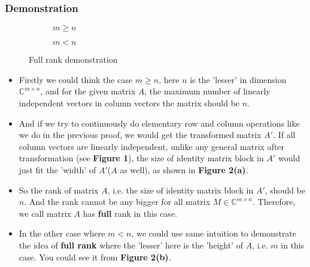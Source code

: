 \subsubsection*{Demonstration}
\begin{figure}[H]
  \centering
  \captionsetup[subfigure]{justification=centering}
  \begin{subfigure}[b]{0.5\textwidth}
    \centering
    \caption{$m \ge n$}
    \end{subfigure}
    \hfill
    \begin{subfigure}[b]{0.4\textwidth}
      \centering
      \caption{$m < n$}
    \end{subfigure}
    \caption{Full rank demonstration}
\end{figure}
\begin{itemize}
  \item Firstly we could think the case $m \ge n$, here $n$ is the 'lesser' in dimension $\mathbb{C}^{m \times n}$, and for the given matrix $A$, the maximum number of linearly independent vectors in column vectors the matrix should be $n$. 
  \item And if we try to continuously do elementary row and column operations like we do in the previous proof, we would get the transformed matrix $A'$. If all column vectors are linearly independent, unlike any general matrix after transformation (see \textbf{Figure 1}), the size of identity matrix block in $A'$ would just fit the 'width' of $A'$($A$ as well), as shown in \textbf{Figure 2(a)}. 
  \item So the rank of matrix $A$, i.e. the size of identity matrix block in $A'$, should be $n$. And the rank cannot be any bigger for all matrix $M \in \mathbb{C}^{m \times n}$. Therefore, we call matrix $A$ has \textbf{full} rank in this case.
  \item In the other case where $m < n$, we could use same intuition to demonstrate the idea of  \textbf{full rank} where the 'lesser' here is the 'height' of $A$, i.e.  $m$ in this case. You could see it from \textbf{Figure 2(b)}.
\end{itemize}
